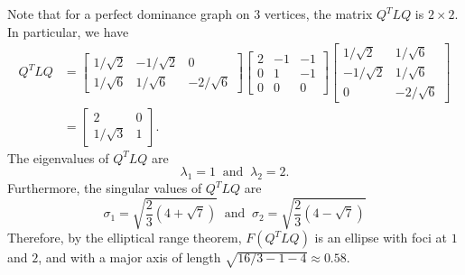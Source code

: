 \documentclass{article}
\begin{document}
Note that for a perfect dominance graph on $3$ vertices, the matrix $Q^{T}LQ$ is $2\times 2$.
In particular, we have
\begin{align*}
Q^{T}LQ &= 
			\begin{bmatrix}1/\sqrt{2} & -1/\sqrt{2} & 0 \\
						1/\sqrt{6} & 1/\sqrt{6} & -2/\sqrt{6} \end{bmatrix}
			\begin{bmatrix} 2 & -1 & -1 \\
						0 & 1 & -1 \\
						0 & 0 & 0 \end{bmatrix}
			\begin{bmatrix}1/\sqrt{2} & 1/\sqrt{6} \\
					-1/\sqrt{2} & 1/\sqrt{6} \\
					0 & -2/\sqrt{6} \end{bmatrix} \\
		&= \begin{bmatrix}2 & 0 \\ 1/\sqrt{3} & 1 \end{bmatrix}.
\end{align*}
The eigenvalues of $Q^{T}LQ$ are
\[
\lambda_{1}=1~\text{ and }~\lambda_{2}=2.
\]
Furthermore, the singular values of $Q^{T}LQ$ are
\[
\sigma_{1} = \sqrt{\frac{2}{3}\left(4+\sqrt{7}\right)}
~\text{ and }~
\sigma_{2} = \sqrt{\frac{2}{3}\left(4-\sqrt{7}\right)}
\]
Therefore, by the elliptical range theorem, $F(Q^{T}LQ)$ is an ellipse with foci at $1$ and $2$, and with a major axis of length $\sqrt{16/3 - 1 - 4}\approx 0.58$. 

\label{Bibliography}


\end{document}

